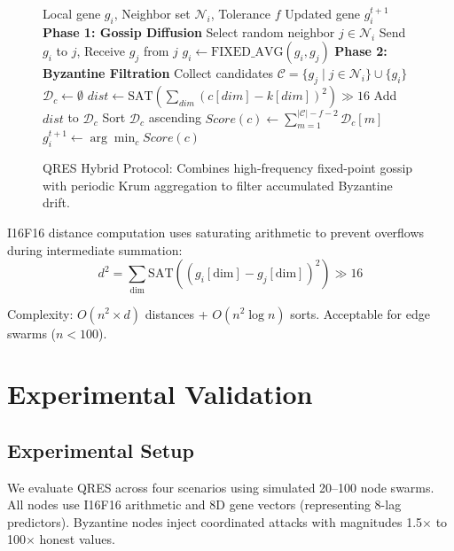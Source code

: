 \documentclass[conference,10pt]{IEEEtran}
\begin{document}
\begin{figure}[t]
\renewcommand{\algorithmicrequire}{\textbf{Input:}}
\renewcommand{\algorithmicensure}{\textbf{Output:}}
\begin{algorithmic}[1]
\REQUIRE Local gene $g_i$, Neighbor set $\mathcal{N}_i$, Tolerance $f$
\ENSURE Updated gene $g_i^{t+1}$
\STATE \textbf{Phase 1: Gossip Diffusion}
    \STATE Select random neighbor $j \in \mathcal{N}_i$
    \STATE Send $g_i$ to $j$, Receive $g_j$ from $j$
    \STATE $g_i \leftarrow \text{FIXED\_AVG}(g_i, g_j)$ 
\ENDFOR
\STATE \textbf{Phase 2: Byzantine Filtration}
\STATE Collect candidates $\mathcal{C} = \{g_j \mid j \in \mathcal{N}_i\} \cup \{g_i\}$
    \STATE $\mathcal{D}_c \leftarrow \emptyset$
        \STATE $dist \leftarrow \text{SAT}\left(\sum_{dim} (c[dim] - k[dim])^2\right) \gg 16$ 
        \STATE Add $dist$ to $\mathcal{D}_c$
    \ENDFOR
    \STATE Sort $\mathcal{D}_c$ ascending
    \STATE $Score(c) \leftarrow \sum_{m=1}^{|\mathcal{C}|-f-2} \mathcal{D}_c[m]$
\ENDFOR
\STATE $g_i^{t+1} \leftarrow \arg\min_{c} Score(c)$
\end{algorithmic}
\caption{QRES Hybrid Protocol: Combines high-frequency fixed-point gossip with periodic Krum aggregation to filter accumulated Byzantine drift.}
\label{alg:qres_full}
\end{figure}

I16F16 distance computation uses saturating arithmetic to prevent overflows during intermediate summation:
\begin{equation}
d^2 = \sum_{\text{dim}} \text{SAT}((g_i[\text{dim}] - g_j[\text{dim}])^2) \gg 16
\end{equation}

Complexity: $O(n^2 \times d)$ distances + $O(n^2 \log n)$ sorts. Acceptable for edge swarms ($n < 100$).

\section{Experimental Validation}
\label{sec:evaluation}

\subsection{Experimental Setup}
We evaluate QRES across four scenarios using simulated 20--100 node swarms. All nodes use I16F16 arithmetic and 8D gene vectors (representing 8-lag predictors). Byzantine nodes inject coordinated attacks with magnitudes 1.5$\times$ to 100$\times$ honest values.
\end{document}
